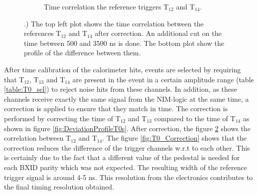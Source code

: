 \begin{figure}[htbp!]
\begin{subfigure}[t]{0.5\textwidth}
		\caption{Time correlation the reference triggers T$_{12}$ and T$_{14}$.}\label{fig:Corr_T12T14}
	\end{subfigure}
	\caption{ .) The top left plot shows the time correlation between the references T$_{12}$ and T$_{14}$ after correction. An additional cut on the time between 500 and 3500 ns is done. The bottom plot show the profile of the difference between them.}
\end{figure}

After time calibration of the calorimeter hits, events are selected by requiring that T$_{12}$, T$_{13}$ and T$_{14}$ are present in the event in a certain amplitude range (table \ref{table:T0_sel}) to reject noise hits from these channels. In addition, as these channels receive exactly the same signal from the NIM-logic at the same time, a correction is applied to ensure that they match in time. The correction is performed by correcting the time of T$_{12}$ and T$_{13}$ compared to the time of T$_{14}$ as shown in figure \ref{fig:DeviationProfileT0s}.
After correction, the figure \ref{fig:Corr_T12T14} shows the correlation between T$_{12}$ and T$_{14}$. The figure \ref{fig:T0_Correction} shows that the correction reduces the difference of the trigger channels w.r.t to each other. This is certainly due to the fact that a different value of the pedestal is needed for each BXID parity which was not expected. The resulting width of the reference trigger signal is around 4-5 ns. This resolution from the electronics contributes to the final timing resolution obtained.

